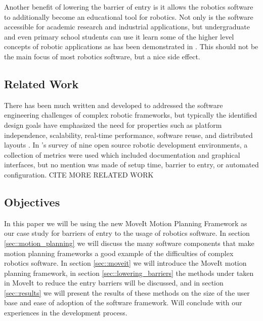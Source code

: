 \documentclass[10pt,journal,compsoc]{joser1}
\begin{document}
{Another benefit of lowering the barrier of entry is it allows the robotics software to additionally become an educational tool for robotics. Not only is the software accessible for academic research and industrial applications, but undergraduate and even primary school students can use it learn some of the higher level concepts of robotic applications as has been demonstrated in \cite{correll2013one, moll2011teaching, }. This should not be the main focus of most robotics software, but a nice side effect.

\subsection{Related Work}

There has been much written and developed to addressed the software engineering challenges of complex robotic frameworks, but typically the identified design goals have emphasized the need for properties such as platform independence, scalability, real-time performance, software reuse, and distributed layouts \cite{realtime_framework, collett2005player, kramer2007development}. In \cite{kramer2007development}'s survey of nine open source robotic development environments, a collection of metrics were used which included documentation and graphical interfaces, but no mention was made of setup time, barrier to entry, or automated configuration. CITE MORE RELATED WORK

\subsection{Objectives}

In this paper we will be using the new MoveIt Motion Planning Framework as our case study for barriers of entry to the usage of robotics software. In section \ref{sec::motion_planning} we will discuss the many software components that make motion planning frameworks a good example of the difficulties of complex robotics software. In section \ref{sec::moveit} we will introduce the MoveIt motion planning framework, in section \ref{sec::lowering_barriers} the methods under taken in MoveIt to reduce the entry barriers will be discussed, and in section \ref{sec::results} we will present the results of these methods on the size of the user base and ease of adoption of the software framework. Will conclude with our experiences in the development process.

}
\end{document}
